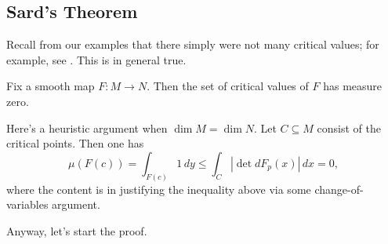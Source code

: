\documentclass[../notes.tex]{subfiles}
\begin{document}
\subsection{Sard's Theorem}
Recall from our examples that there simply were not many critical values; for example, see . This is in general true.
\begin{theorem}[Sard] \label{thm:sard}
	Fix a smooth map $F\colon M\to N$. Then the set of critical values of $F$ has measure zero.
\end{theorem}
\begin{remark}
	Here's a heuristic argument when $\dim M=\dim N$. Let $C\subseteq M$ consist of the critical points. Then one has
	\[\mu(F(c))=\int_{F(c)}1\,dy\le\int_C\left|\det dF_p(x)\right|\,dx=0,\]
	where the content is in justifying the inequality above via some change-of-variables argument.
\end{remark}
Anyway, let's start the proof.
\end{document}
